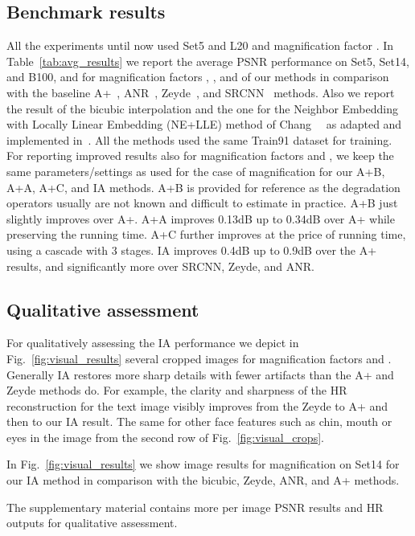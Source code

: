 \documentclass[10pt,twocolumn,letterpaper]{article}
\begin{document}
\subsection{Benchmark results}
\label{ssc:benchmarks}
All the experiments until now used Set5 and L20 and magnification factor .
In Table~\ref{tab:avg_results} we report the average PSNR performance on Set5, Set14, and B100, and for magnification factors , , and  of our methods in comparison with the baseline A+~\cite{Timofte-ACCV-2014}, ANR~\cite{Timofte-ICCV-2013}, Zeyde~\cite{Zeyde-CS-2012}, and SRCNN~\cite{Dong-ECCV-2014} methods. Also we report the result of the bicubic interpolation and the one for the Neighbor Embedding with Locally Linear Embedding (NE+LLE) method of Chang~\etal~\cite{Chang-CVPR-2004} as adapted and implemented in~\cite{Timofte-ICCV-2013}. All the methods used the same Train91 dataset for training.
For reporting improved results also for magnification factors  and , we keep the same parameters/settings as used for the case of magnification  for our A+B, A+A, A+C, and IA methods.
A+B is provided for reference as the degradation operators usually are not known and difficult to estimate in practice. A+B just slightly improves over A+.
A+A improves 0.13dB up to 0.34dB over A+ while preserving the running time. A+C further improves at the price of running time, using a cascade with 3 stages.
IA improves 0.4dB up to 0.9dB over the A+ results, and significantly more over SRCNN, Zeyde, and ANR. 

\subsection{Qualitative assessment}
For qualitatively assessing the IA performance we depict in Fig.~\ref{fig:visual_results} several cropped images for magnification factors  and . Generally IA restores more sharp details with fewer artifacts than the A+ and Zeyde methods do. For example, the clarity and sharpness of the HR reconstruction for the text image visibly improves from the Zeyde to A+ and then to our IA result.
The same for other face features such as chin, mouth or eyes in the image from the second row of Fig.~\ref{fig:visual_crops}.

In Fig.~\ref{fig:visual_results} we show image results for magnification  on Set14 for our IA method in comparison with the bicubic, Zeyde, ANR, and A+ methods.

The supplementary material contains more per image PSNR results and HR outputs for qualitative assessment.
\end{document}
